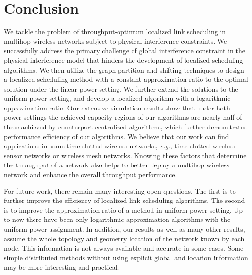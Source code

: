 \documentclass[journal]{IEEEtran}
\begin{document}
\section{Conclusion}
We tackle  the problem of throughput-optimum localized link scheduling in multihop wireless networks subject to physical interference constraints.
We successfully address the primary challenge of global interference constraint in the physical interference model that hinders the development of localized scheduling algorithms. We then utilize the graph partition and shifting techniques to design a localized scheduling method with a constant approximation ratio to the optimal solution under the linear power setting. We further extend the solutions to the uniform power setting, and develop a localized algorithm with a logarithmic approximation ratio. Our extensive simulation results show that under both power settings the achieved capacity regions of our algorithms are nearly half of these achieved by counterpart centralized algorithms, which further demonstrates performance efficiency of our algorithms.  We believe that our work can find applications in some time-slotted wireless networks, \emph{e.g.}, time-slotted wireless sensor networks or wireless mesh networks. Knowing these factors that determine the throughput of a network also helps to better deploy a multihop wireless network and enhance the overall throughput performance.

For future work, there remain many interesting open questions.
The first is to further improve the efficiency of localized link scheduling algorithms. The second is to improve the approximation ratio of a method in uniform power setting. Up to now there have been only logarithmic approximation algorithms with the uniform power assignment. In addition, our results as well as many other results, assume the whole topology and geometry location of the network known by each node. This information is not always available and accurate in some cases. Some simple distributed methods without using explicit global and location information may be more interesting and practical.








\appendices
\end{document}
